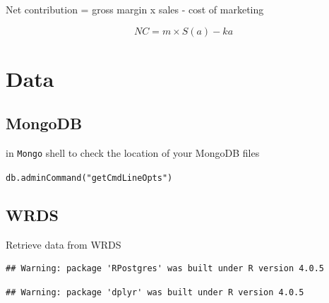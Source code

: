 \documentclass[
]{book}
\begin{document}
Net contribution = gross margin x sales - cost of marketing

\[
NC = m \times S(a) -ka
\]

\hypertarget{data}{%
\chapter{Data}\label{data}}

\hypertarget{mongodb}{%
\section{MongoDB}\label{mongodb}}

in \texttt{Mongo} shell to check the location of your MongoDB files

\texttt{db.adminCommand("getCmdLineOpts")}

\hypertarget{wrds}{%
\section{WRDS}\label{wrds}}

Retrieve data from WRDS

\begin{verbatim}
## Warning: package 'RPostgres' was built under R version 4.0.5
\end{verbatim}

\begin{verbatim}
## Warning: package 'dplyr' was built under R version 4.0.5
\end{verbatim}
\end{document}

